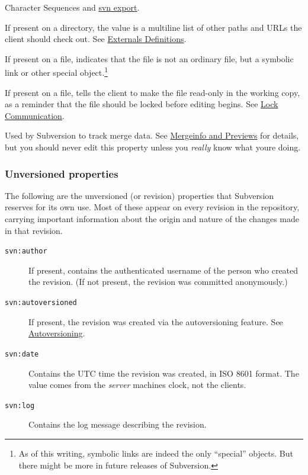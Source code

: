 \begin{description}
{Character Sequences} and \hyperref[svn.ref.svn.c.export]{svn export}.
\item[\texttt{svn:externals}]
If present on a directory, the value is a multiline list of other paths
and URLs the client should check out. See
\hyperref[svn.advanced.externals]{Externals Definitions}.
\item[\texttt{svn:special}]
If present on a file, indicates that the file is not an ordinary file,
but a symbolic link or other special object.\footnote{As of this
  writing, symbolic links are indeed the only ``special'' objects. But
  there might be more in future releases of Subversion.}
\item[\texttt{svn:needs-lock}]
If present on a file, tells the client to make the file read-only in the
working copy, as a reminder that the file should be locked before
editing begins. See
\hyperref[svn.advanced.locking.lock-communication]{Lock Communication}.
\item[\texttt{svn:mergeinfo}]
Used by Subversion to track merge data. See
\hyperref[svn.branchmerge.basicmerging.mergeinfo]{Mergeinfo and
Previews} for details, but you should never edit this property unless
you \emph{really} know what you\textquotesingle re doing.
\end{description}

\subsubsection{Unversioned
properties}\label{svn.advanced.props.ref.unversioned}

The following are the unversioned (or revision) properties that
Subversion reserves for its own use. Most of these appear on every
revision in the repository, carrying important information about the
origin and nature of the changes made in that revision.

\begin{description}
\item[\texttt{svn:author}]
If present, contains the authenticated username of the person who
created the revision. (If not present, the revision was committed
anonymously.)
\item[\texttt{svn:autoversioned}]
If present, the revision was created via the autoversioning feature. See
\hyperref[svn.webdav.autoversioning]{Autoversioning}.
\item[\texttt{svn:date}]
Contains the UTC time the revision was created, in ISO 8601 format. The
value comes from the \emph{server} machine\textquotesingle s clock, not
the client\textquotesingle s.
\item[\texttt{svn:log}]
Contains the log message describing the revision.
\end{description}


